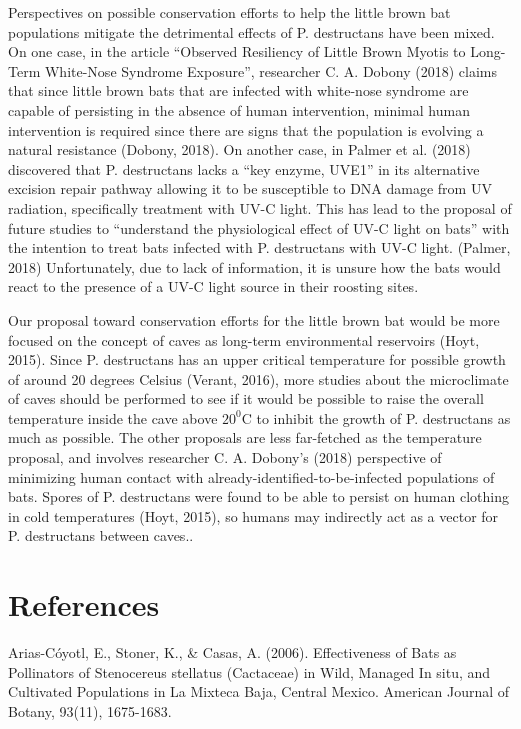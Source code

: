 \documentclass[12pt]{article}
\begin{document}
Perspectives on possible conservation efforts to help the little brown bat populations mitigate the detrimental effects of P. destructans have been mixed. On one case, in the article “Observed Resiliency of Little Brown Myotis to Long-Term White-Nose Syndrome Exposure”, researcher C. A. Dobony (2018) claims that since little brown bats that are infected with white-nose syndrome are capable of persisting in the absence of human intervention, minimal human intervention is required since there are signs that the population is evolving a natural resistance (Dobony, 2018). On another case, in Palmer et al. (2018) discovered that P. destructans lacks a “key enzyme, UVE1” in its alternative excision repair pathway allowing it to be susceptible to DNA damage from UV radiation, specifically treatment with UV-C light. This has lead to the proposal of future studies to “understand the physiological effect of UV-C light on bats” with the intention to treat bats infected with P. destructans with UV-C light. (Palmer, 2018) Unfortunately, due to lack of information, it is unsure how the bats would react to the presence of a UV-C light source in their roosting sites. 

Our proposal toward conservation efforts for the little brown bat would be more focused on the concept of caves as long-term environmental reservoirs (Hoyt, 2015). Since P. destructans has an upper critical temperature for possible growth of around 20 degrees Celsius (Verant, 2016), more studies about the microclimate of caves should be performed to see if it would be possible to raise the overall temperature inside the cave above $20^0$C to inhibit the growth of P. destructans as much as possible. The other proposals are less far-fetched as the temperature proposal, and involves researcher C. A. Dobony’s (2018) perspective of minimizing human contact with already-identified-to-be-infected populations of bats. Spores of P. destructans were found to be able to persist on human clothing in cold temperatures (Hoyt, 2015), so humans may indirectly act as a vector for P. destructans between caves..



\section*{\centering \sc \large References}

\parindent -0.5cm \hangindent=0.5cm Arias-Cóyotl, E., Stoner, K., \& Casas, A. (2006). Effectiveness of Bats as Pollinators of Stenocereus stellatus (Cactaceae) in Wild, Managed In situ, and Cultivated Populations in La Mixteca Baja, Central Mexico. American Journal of Botany, 93(11), 1675-1683.
 
\end{document}
